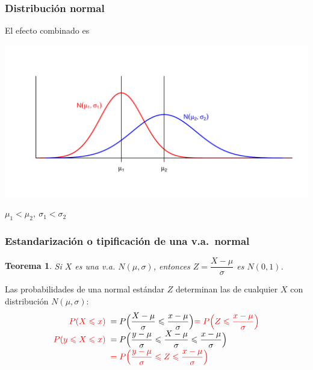 \documentclass[handout]{beamer}\usepackage[]{graphicx}\usepackage[]{color}
\newcommand{\red}[1]{\textcolor{red}{#1}}
\renewcommand{\leq}{\leqslant}
\theoremstyle{plain}
\newtheorem{teorema}{Teorema}
\theoremstyle{definition}
\begin{document}
\begin{frame}
\frametitle{Distribución normal}

El efecto combinado es
\begin{center}
\includegraphics[width=\linewidth]{musigma}

$\mu_1<\mu_2,\ \sigma_1<\sigma_2$
\end{center}
\end{frame}




\begin{frame}
\frametitle{Estandarización  o tipificación de una v.a.\ normal}

\begin{teorema}
Si $X$ es una v.a. $N(\mu,\sigma)$, entonces
$Z=\dfrac{X-\mu}{\sigma}$
es $N(0,1)$.
\end{teorema}

Las probabilidades de una normal estándar $Z$ determinan las de cualquier $X$  con distribución  $N(\mu,\sigma)$:
$$
\begin{array}{rl}
\red{P(X\leq x)} & \displaystyle \hspace*{-1ex} =P\Big(\frac{X-\mu}{\sigma}\leq \frac{x-\mu}{\sigma}\Big)\red{=P\Big(Z\leq \frac{x-\mu}{\sigma}\Big)}\\[1ex]
\red{P(y\leq X\leq x)} & \displaystyle \hspace*{-1ex} =P\Big( \frac{y-\mu}{\sigma}\leq \frac{X-\mu}{\sigma}\leq \frac{x-\mu}{\sigma}\Big)\\[1ex] & \displaystyle \hspace*{-1ex} \red{=P\Big(\frac{y-\mu}{\sigma}\leq Z\leq \frac{x-\mu}{\sigma}\Big)}
\end{array}
$$
\end{frame}
\end{document}
